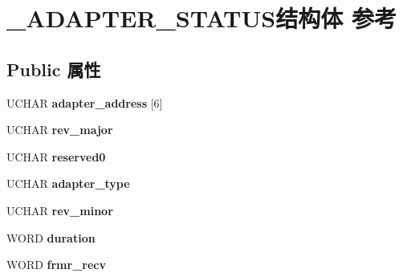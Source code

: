 \hypertarget{struct___a_d_a_p_t_e_r___s_t_a_t_u_s}{}\section{\+\_\+\+A\+D\+A\+P\+T\+E\+R\+\_\+\+S\+T\+A\+T\+U\+S结构体 参考}
\label{struct___a_d_a_p_t_e_r___s_t_a_t_u_s}
\subsection*{Public 属性}
\begin{DoxyCompactItemize}
\item 
\mbox{\label{struct___a_d_a_p_t_e_r___s_t_a_t_u_s_aef213c765063176187d782132ca114cd}} 
U\+C\+H\+AR {\bfseries adapter\+\_\+address} \mbox{[}6\mbox{]}
\item 
\mbox{\label{struct___a_d_a_p_t_e_r___s_t_a_t_u_s_a2a58b95674dfb302cd97d8e83b4e5970}} 
U\+C\+H\+AR {\bfseries rev\+\_\+major}
\item 
\mbox{\label{struct___a_d_a_p_t_e_r___s_t_a_t_u_s_a1ff27f24ef41792d01f852b7ed9c6c7a}} 
U\+C\+H\+AR {\bfseries reserved0}
\item 
\mbox{\label{struct___a_d_a_p_t_e_r___s_t_a_t_u_s_ab05424c7f8aa2301f1e19201f62b0d35}} 
U\+C\+H\+AR {\bfseries adapter\+\_\+type}
\item 
\mbox{\label{struct___a_d_a_p_t_e_r___s_t_a_t_u_s_a8c656fcf7221b5cdb7e29587803ef07d}} 
U\+C\+H\+AR {\bfseries rev\+\_\+minor}
\item 
\mbox{\label{struct___a_d_a_p_t_e_r___s_t_a_t_u_s_a208f098666c4be61229905ada2fab661}} 
W\+O\+RD {\bfseries duration}
\item 
\mbox{\label{struct___a_d_a_p_t_e_r___s_t_a_t_u_s_a0f6dee767b4a23b3bb72607913001ac1}} 
W\+O\+RD {\bfseries frmr\+\_\+recv}
\item 
\mbox{\label{struct___a_d_a_p_t_e_r___s_t_a_t_u_s_a85a7a42c41fef998d1a40dcb83fa95a4}} 

\end{DoxyCompactItemize}
